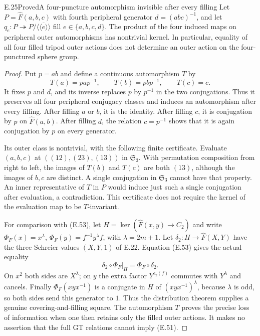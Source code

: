 \begin{result}{E.25}{Proved}{A four-puncture automorphism invisible after every filling}
Let $P=\widehat F(a,b,c)$ with fourth peripheral generator
$d=(abc)^{-1}$, and let $q_e:P\twoheadrightarrow
P/\overline{\langle\!\langle e\rangle\!\rangle}$ fill
$e\in\{a,b,c,d\}$.  The product of the four induced
maps on peripheral outer automorphisms has nontrivial
kernel.  In particular, equality of all four filled
tripod outer actions does not determine an outer action
on the four-punctured sphere group.
\end{result}
\begin{proof}
Put $p=ab$ and define a continuous automorphism $T$ by
\[
 T(a)=pap^{-1},\qquad T(b)=pbp^{-1},\qquad T(c)=c.
\]
It fixes $p$ and $d$, and its inverse replaces $p$ by
$p^{-1}$ in the two conjugations.  Thus it preserves
all four peripheral conjugacy classes and induces an
automorphism after every filling.  After filling $a$
or $b$, it is the identity.  After filling $c$, it
is conjugation by $p$ on $\widehat F(a,b)$.  After
filling $d$, the relation $c=p^{-1}$ shows that it is
again conjugation by $p$ on every generator.

Its outer class is nontrivial, with the following finite
certificate.  Evaluate $(a,b,c)$ at
$((12),(23),(13))$ in $\mathfrak S_3$.  With permutation
composition from right to left, the images of $T(b)$
and $T(c)$ are both $(13)$, although the images of
$b,c$ are distinct.  A single conjugation in
$\mathfrak S_3$ cannot have that property.  An inner
representative of $T$ in $P$ would induce just such a
single conjugation after evaluation, a contradiction.
This certificate does not require the kernel of the
evaluation map to be $T$-invariant.

For comparison with (E.53), let
$H=\ker(\widehat F(x,y)\to C_2)$ and write
$\Phi_F(x)=x^\lambda$,
$\Phi_F(y)=f^{-1}y^\lambda f$, with $\lambda=2m+1$.
Let $\delta_2:H\to\widehat F(X,Y)$ have the three
Schreier values $(X,Y,1)$ of E.22.  Equation (E.53)
gives the actual equality
\[
 \delta_2\circ\Phi_F|_H
       =\Phi_F\circ\delta_2.                              \tag{E.60}
\]
On $x^2$ both sides are $X^\lambda$; on $y$ the
extra factor $Y^{c_2(f)}$ commutes with $Y^\lambda$
and cancels.  Finally $\Phi_F(xyx^{-1})$ is a
conjugate in $H$ of $(xyx^{-1})^\lambda$, because
$\lambda$ is odd, so both sides send this generator
to $1$.  Thus the distribution theorem supplies a
genuine covering-and-filling square.  The automorphism
$T$ proves the precise loss of information when one
then retains only the filled outer actions.  It makes
no assertion that the full GT relations cannot imply
(E.51).
\end{proof}

